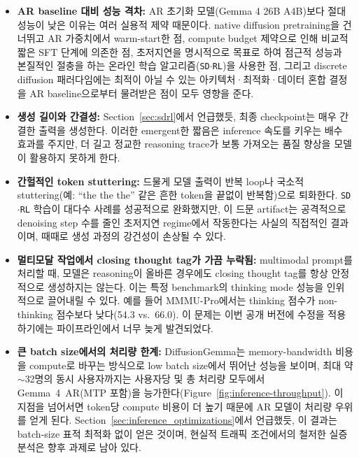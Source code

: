 \documentclass[11pt, a4paper, logo, copyright, gdm]{google}
\newcommand{\sdrl}{\texttt{{\small SD$\cdot$RL}}\xspace}
\begin{document}
\begin{itemize}[topsep=0pt]

    \item \textbf{AR baseline 대비 성능 격차:} AR 초기화 모델(Gemma 4 26B A4B)보다 절대 성능이 낮은 이유는 여러 실용적 제약 때문이다. native diffusion pretraining을 건너뛰고 AR 가중치에서 warm-start한 점, compute budget 제약으로 인해 비교적 짧은 SFT 단계에 의존한 점, 초저지연을 명시적으로 목표로 하여 점근적 성능과 본질적인 절충을 하는 온라인 학습 알고리즘(\sdrl)을 사용한 점, 그리고 discrete diffusion 패러다임에는 최적이 아닐 수 있는 아키텍처·최적화·데이터 혼합 결정을 AR baseline으로부터 물려받은 점이 모두 영향을 준다.

    \item \textbf{생성 길이와 간결성:} Section~\ref{sec:sdrl}에서 언급했듯, 최종 checkpoint는 매우 간결한 출력을 생성한다. 이러한 emergent한 짧음은 inference 속도를 키우는 배수 효과를 주지만, 더 길고 정교한 reasoning trace가 보통 가져오는 품질 향상을 모델이 활용하지 못하게 한다.

    \item \textbf{간헐적인 token stuttering:} 드물게 모델 출력이 반복 loop나 국소적 stuttering(예: ``the the the'' 같은 흔한 token을 끝없이 반복함)으로 퇴화한다. \sdrl 학습이 대다수 사례를 성공적으로 완화했지만, 이 드문 artifact는 공격적으로 denoising step 수를 줄인 초저지연 regime에서 작동한다는 사실의 직접적인 결과이며, 때때로 생성 과정의 강건성이 손상될 수 있다.
    
    \item \textbf{멀티모달 작업에서 closing thought tag가 가끔 누락됨:} multimodal prompt를 처리할 때, 모델은 reasoning이 올바른 경우에도 closing thought tag를 항상 안정적으로 생성하지는 않는다. 이는 특정 benchmark의 thinking mode 성능을 인위적으로 끌어내릴 수 있다. 예를 들어 MMMU-Pro에서는 thinking 점수가 non-thinking 점수보다 낮다(54.3 vs.\ 66.0). 이 문제는 이번 공개 버전에 수정을 적용하기에는 파이프라인에서 너무 늦게 발견되었다.

    \item \textbf{큰 batch size에서의 처리량 한계:} DiffusionGemma는 memory-bandwidth 비용을 compute로 바꾸는 방식으로 low batch size에서 뛰어난 성능을 보이며, 최대 약 $\sim$32명의 동시 사용자까지는 사용자당 및 총 처리량 모두에서 Gemma~4~AR(MTP 포함)을 능가한다(Figure~\ref{fig:inference-throughput}). 이 지점을 넘어서면 token당 compute 비용이 더 높기 때문에 AR 모델이 처리량 우위를 얻게 된다. Section~\ref{sec:inference_optimizations}에서 언급했듯, 이 결과는 batch-size 표적 최적화 없이 얻은 것이며, 현실적 트래픽 조건에서의 철저한 실증 분석은 향후 과제로 남아 있다.


\end{itemize}
\end{document}
